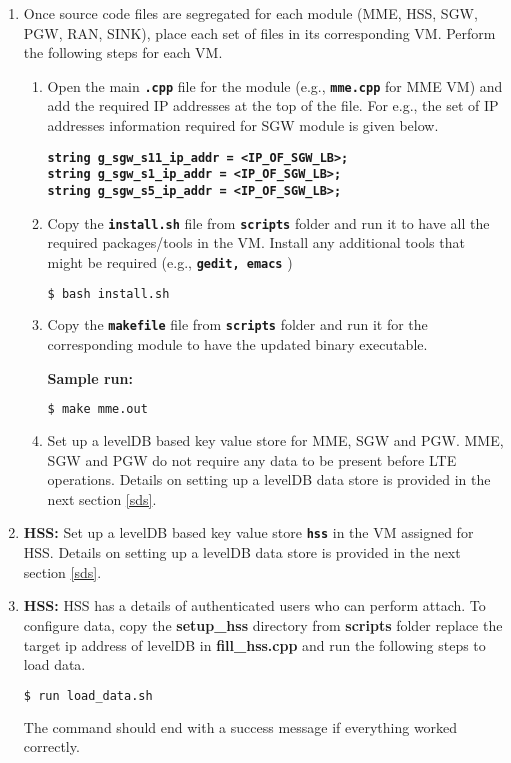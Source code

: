 \pdfminorversion=4\documentclass[hidelinks]{report}
\newcommand{\cf}[1] {
	\textbf{\texttt{#1}}
}
\begin{document}
\begin{enumerate}
\item Once source code files are segregated for each module (MME, HSS, SGW, PGW, RAN, SINK), place each set of files in its corresponding VM. Perform the following steps for each VM.

\begin{enumerate}

\item Open the main \cf{.cpp} file for the module (e.g., \cf{mme.cpp} for MME VM) and add the required IP addresses at the top of the file. For e.g., the set of IP addresses information required for SGW module is given below.

\begin{center}

\cf{string g\_sgw\_s11\_ip\_addr = <IP\_OF\_SGW\_LB>;} \\
\cf{string g\_sgw\_s1\_ip\_addr = <IP\_OF\_SGW\_LB>;} \\
\cf{string g\_sgw\_s5\_ip\_addr = <IP\_OF\_SGW\_LB>;} \\

\end{center}

\item Copy the \cf{install.sh} file from \cf{scripts} folder and run it to have all the required packages/tools in the VM. Install any additional tools that might be required (e.g., \cf{gedit, emacs})

\begin{lstlisting}[language=bash]
$ bash install.sh
\end{lstlisting}

\item Copy the \cf{makefile} file from \cf{scripts} folder and run it for the corresponding module to have the updated binary executable.

\textbf{Sample run:}

\begin{lstlisting}[language=bash]
$ make mme.out
\end{lstlisting}

\item  Set up a levelDB based key value store for MME, SGW and PGW. MME, SGW and PGW do not require any data to be present before LTE operations. Details on setting up a levelDB data store is provided in the next section \ref{sds}.
\end{enumerate}

\item \textbf{HSS:} Set up a levelDB based key value store \cf{hss} in the VM assigned for HSS. Details on setting up a levelDB data store is provided in the next section \ref{sds}.


\item \textbf{HSS:} HSS has a details of authenticated users who can perform attach. To configure data, copy the \textbf{setup\_hss} directory from \textbf{scripts} folder replace the target ip address of levelDB in \textbf{fill\_hss.cpp} and run the following steps to load data. 
\begin{lstlisting}[language=bash]
$ run load_data.sh
\end{lstlisting}
The command should end with a success message if everything worked correctly.
\end{enumerate}
\end{document}
